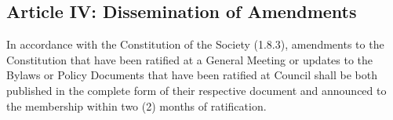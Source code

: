 \subsection{Article IV: Dissemination of Amendments}
\begin{longenum}[ label*=\thesubsection.\arabic*., align=left] 
\item In accordance with the Constitution of the Society (1.8.3), amendments to the Constitution that have been ratified at a General Meeting or updates to the Bylaws or Policy Documents that have been ratified at Council shall be both published in the complete form of their respective document and announced to the membership within two (2) months of ratification.
\end{longenum}


















